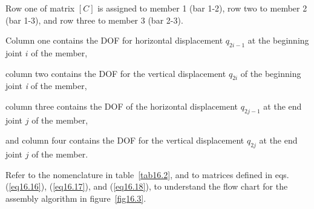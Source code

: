 \documentclass{AeroStructure-ERJohnson}
\begin{document}
\vspace*{-1.6pc}

\noindent Row one of matrix $[C]$ is assigned to member 1 (bar 1-2), row two to member 2 (bar 1-3), and row three to member 3 (bar 2-3).\vspace*{-2pt}


\begin{unlist}
\item Column one contains the DOF for horizontal displacement $q_{2 i-1}$ at the beginning joint $i$ of the member,
\item column two contains the DOF for the vertical displacement $q_{2 i}$ of the beginning joint \textit{i} of the member,
\item column three contains the DOF of the horizontal displacement $q_{2 j-1}$ at the end joint $j$ of the member,
\item and column four contains the DOF for the vertical displacement $q_{2 j}$ at the end joint $j$ of the member.
\end{unlist}

Refer to the nomenclature in table~\ref{tab16.2}, and to matrices defined in eqs. (\ref{eq16.16}), (\ref{eq16.17}), and (\ref{eq16.18}), to understand the flow chart for the assembly algorithm in figure~\ref{fig16.3}.

\pagebreak
\end{document}

